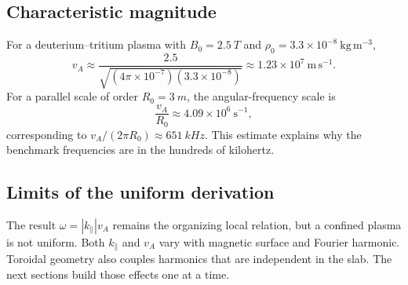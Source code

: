\subsection{Characteristic magnitude}
For a deuterium--tritium plasma with $B_0=\SI{2.5}{T}$ and $\rho_0=3.3\times10^{-8}\ \mathrm{kg\,m^{-3}}$,
\begin{equation}
v_A\approx\frac{2.5}{\sqrt{(4\pi\times10^{-7})(3.3\times10^{-8})}}
\approx1.23\times10^7\ \mathrm{m\,s^{-1}}.
\end{equation}
For a parallel scale of order $R_0=\SI{3}{m}$, the angular-frequency scale is
\begin{equation}
\frac{v_A}{R_0}\approx4.09\times10^6\ \mathrm{s^{-1}},
\end{equation}
corresponding to $v_A/(2\pi R_0)\approx\SI{651}{kHz}$. This estimate explains why the benchmark frequencies are in the hundreds of kilohertz.

\subsection{Limits of the uniform derivation}
The result $\omega=|k_\parallel|v_A$ remains the organizing local relation, but a confined plasma is not uniform. Both $k_\parallel$ and $v_A$ vary with magnetic surface and Fourier harmonic. Toroidal geometry also couples harmonics that are independent in the slab. The next sections build those effects one at a time.
